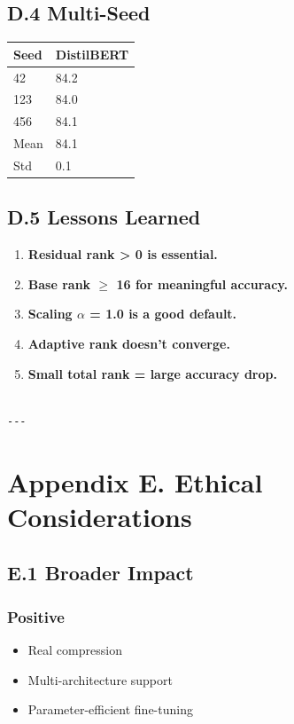 \subsection{D.4 Multi-Seed}

\begin{table}[H]
\centering
\small
\begin{tabular}{ll}
\toprule
\textbf{Seed} & \textbf{DistilBERT} \\
\midrule
42 & 84.2 \\
123 & 84.0 \\
456 & 84.1 \\
Mean & 84.1 \\
Std & 0.1 \\
\bottomrule
\end{tabular}
\end{table}

\subsection{D.5 Lessons Learned}

\begin{enumerate}
\item \textbf{Residual rank > 0 is essential.}
\item \textbf{Base rank $\ge$ 16 for meaningful accuracy.}
\item \textbf{Scaling $\alpha$ = 1.0 is a good default.}
\item \textbf{Adaptive rank doesn't converge.}
\item \textbf{Small total rank = large accuracy drop.}
\end{enumerate}
\begin{lstlisting}

---
\end{lstlisting}

\section{Appendix E. Ethical Considerations}

\subsection{E.1 Broader Impact}

\subsubsection{Positive}
\begin{itemize}
\item Real compression
\item Multi-architecture support
\item Parameter-efficient fine-tuning

\end{itemize}
